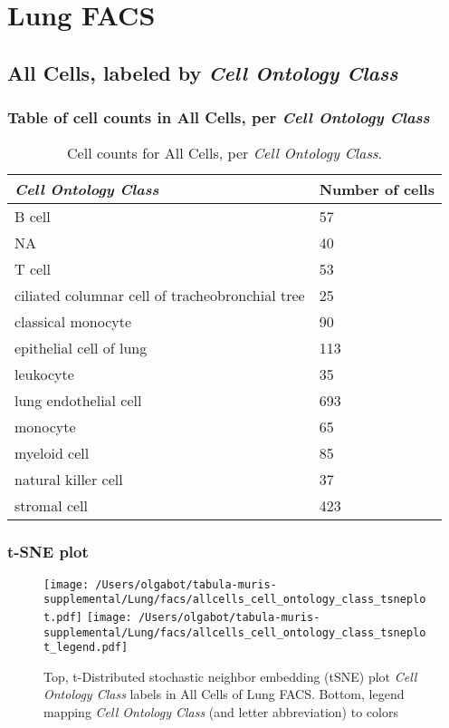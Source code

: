 \clearpage
\section{Lung FACS}

\subsection{All Cells, labeled by \emph{Cell Ontology Class}}
\subsubsection{Table of cell counts in All Cells, per \emph{Cell Ontology Class}}\begin{table}[h]
\centering
\label{my-label}
\begin{tabular}{@{}ll@{}}
\toprule

\emph{Cell Ontology Class}& Number of cells \\ \midrule
B cell & 57 \\

NA & 40 \\

T cell & 53 \\

ciliated columnar cell of tracheobronchial tree & 25 \\

classical monocyte & 90 \\

epithelial cell of lung & 113 \\

leukocyte & 35 \\

lung endothelial cell & 693 \\

monocyte & 65 \\

myeloid cell & 85 \\

natural killer cell & 37 \\

stromal cell & 423 \\
\bottomrule
\end{tabular}
\caption{Cell counts for All Cells, per \emph{Cell Ontology Class}.}
\end{table}

\clearpage
\subsubsection{t-SNE plot}
\begin{figure}[h]
\centering
\texttt{[image: /Users/olgabot/tabula-muris-supplemental/Lung/facs/allcells\_cell\_ontology\_class\_tsneplot.pdf]}
\texttt{[image: /Users/olgabot/tabula-muris-supplemental/Lung/facs/allcells\_cell\_ontology\_class\_tsneplot\_legend.pdf]}
\caption{Top, t-Distributed stochastic neighbor embedding (tSNE) plot  \emph{Cell Ontology Class} labels in All Cells of Lung FACS. Bottom, legend mapping \emph{Cell Ontology Class} (and letter abbreviation) to colors}
\end{figure}


